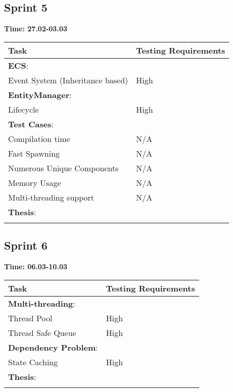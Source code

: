 \documentclass[hidelinks]{article}
\begin{document}
\subsection{Sprint 5}
\textbf{Time: 27.02-03.03}\\
\begin{tabularx}{\textwidth}{l >{\centering\arraybackslash}X}
\hline\noalign{\smallskip}
  Task                              & Testing Requirements   \\
\hline\noalign{\smallskip}
  \textbf{ECS}:                     &                        \\
  Event System (Inheritance based)  & High                   \\
    
  \textbf{EntityManager}:           &                        \\
  Lifecycle                         & High                   \\
    
  \textbf{Test Cases}:              &                        \\
  Compilation time                  &  N/A                   \\    
  Fast Spawning                     &  N/A                   \\
  Numerous Unique Components        &  N/A                   \\            
  Memory Usage                      &  N/A                   \\
  Multi-threading support           &  N/A                   \\        
    
    \textbf{Thesis}:                &                        \\
\hline\noalign{\smallskip}
\end{tabularx}

\subsection{Sprint 6}
\textbf{Time: 06.03-10.03}\\
\begin{tabularx}{\textwidth}{l >{\centering\arraybackslash}X}
\hline\noalign{\smallskip}
  Task                              & Testing Requirements   \\
\hline\noalign{\smallskip}
  \textbf{Multi-threading}:         &                        \\
  Thread Pool                       & High                   \\
  Thread Safe Queue                 & High                   \\
  
  \textbf{Dependency Problem}:      &                        \\ 
  State Caching                     & High                   \\

  \textbf{Thesis}:                  &                        \\
\hline\noalign{\smallskip}
\end{tabularx}
\end{document}
